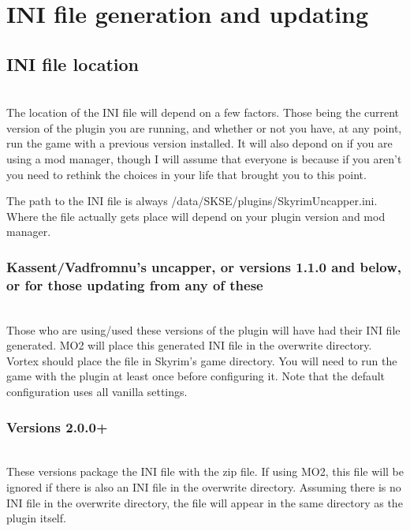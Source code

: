 \documentclass[12pt]{amsart}
\begin{document}
\startblock
\section{INI file generation and updating}

\bigskip
\subsection{INI file location}\hfill\\

The location of the INI file will depend on a few factors. Those being the
current version of the plugin you are running, and whether or not you have,
at any point, run the game with a previous version installed. It will also
depond on if you are using a mod manager, though I will assume that everyone
is because if you aren't you need to rethink the choices in your life that
brought you to this point.

The path to the INI file is always /data/SKSE/plugins/SkyrimUncapper.ini.
Where the file actually gets place will depend on your plugin version and
mod manager.
\stopblock

\startblock
\subsubsection{Kassent/Vadfromnu's uncapper, or versions 1.1.0 and below,
or for those updating from any of these}\hfill\\

Those who are using/used these versions of the plugin will have had their
INI file generated. MO2 will place this generated INI file in the overwrite
directory. Vortex should place the file in Skyrim's game directory. You will
need to run the game with the plugin at least once before configuring it.
Note that the default configuration uses all vanilla settings.
\stopblock

\startblock
\subsubsection{Versions 2.0.0+}\hfill\\

These versions package the INI file with the zip file. If using MO2, this file
will be ignored if there is also an INI file in the overwrite directory.
Assuming there is no INI file in the overwrite directory, the file will appear
in the same directory as the plugin itself.
\stopblock
\end{document}
